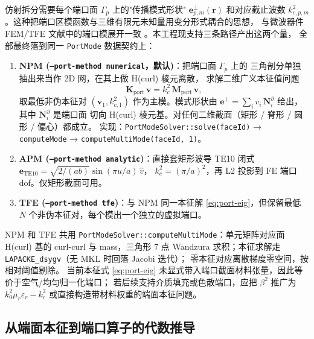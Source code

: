 \documentclass[UTF8,a4paper,11pt]{ctexart}
\newcommand{\Ne}{\bm{N}}
\newcommand{\code}[1]{\texttt{\small #1}}
\begin{document}
仿射拆分需要每个端口面 $\Gamma_p$ 上的"传播模式形状" $\bm e_{p,m}^{\perp}(\bm r)$
和对应截止波数 $k_{c,p,m}^{2}$。这种把端口区模函数与三维有限元未知量用变分形式耦合的思想，
与微波器件 FEM/TFE 文献中的端口模展开一致 \cite{Cendes1988,Lee1990}。本工程现支持三条路径产出这两个量，
全部最终落到同一 \code{PortMode} 数据契约上：
\begin{enumerate}[leftmargin=2em]
\item \textbf{NPM (\code{--port-method numerical}，默认)}：把端口面 $\Gamma_p$ 上的
三角剖分单独抽出来当作 2D 网，在其上做 H(curl) 棱元离散，
求解二维广义本征值问题
\begin{equation}
    \bm K_{\text{port}}\,\bm v=k_{c}^{2}\,\bm M_{\text{port}}\,\bm v,
    \label{eq:port-eig}
\end{equation}
取最低非伪本征对 $(\bm v_1,k_{c,1}^{2})$ 作为主模。模式形状由
$\bm e^{\perp}=\sum_i v_i\,\Ne_i^{\partial}$ 给出，其中 $\Ne_i^{\partial}$ 是端口面
切向 H(curl) 棱元基。对任何二维截面（矩形 / 脊形 / 圆形 / 偏心）都成立。
实现：\code{PortModeSolver::solve(faceId)} → \code{computeMode} →
\code{computeMultiMode(faceId, 1)}。
\item \textbf{APM (\code{--port-method analytic})}：直接套矩形波导 TE10 闭式
$\bm e_{\text{TE10}}=\sqrt{2/(ab)}\sin(\pi u/a)\,\hat v$，
$k_c^{2}=(\pi/a)^{2}$，再 L2 投影到 FE 端口 dof。仅矩形截面可用。
\item \textbf{TFE (\code{--port-method tfe})}：与 NPM 同一本征解
\eqref{eq:port-eig}，但保留最低 $N$ 个非伪本征对，每个模出一个独立的虚拟端口。
\end{enumerate}
NPM 和 TFE 共用 \code{PortModeSolver::computeMultiMode}：单元矩阵对应面 H(curl)
基的 curl-curl 与 mass，三角形 7 点 Wandzura 求积；本征求解走
\code{LAPACKE\_dsygv}（无 MKL 时回落 Jacobi 迭代）；
零本征对应离散梯度零空间，按相对阈值剔除。
当前本征式 \eqref{eq:port-eig} 未显式带入端口截面材料张量，因此等价于空气/均匀归一化端口；
若后续支持介质填充或色散端口，应把 $\beta^2$ 推广为 $k_0^2\mu_r\varepsilon_r-k_c^2$
或直接构造带材料权重的端面本征问题。

\subsection{从端面本征到端口算子的代数推导}
\label{sec:port-affine-derivation}
\end{document}
